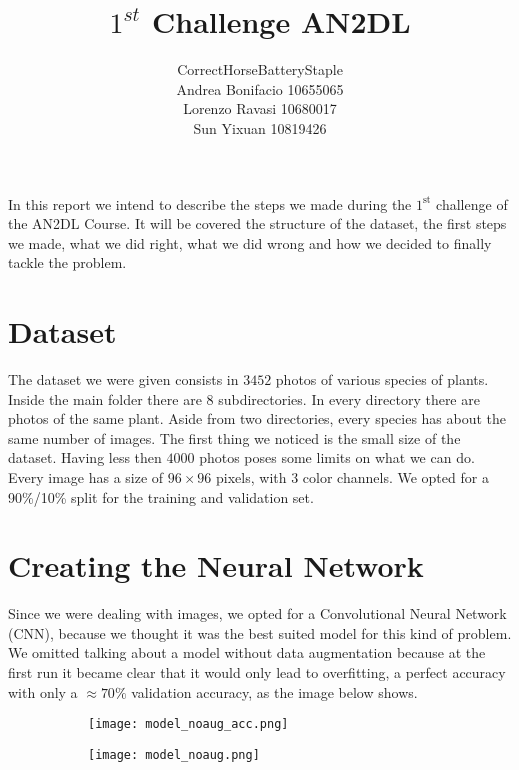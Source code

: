 \documentclass[a4paper,11pt]{article}
\numberwithin{equation}{section}
\begin{document}
\title{\vspace{-3cm}\(1^{st}\) Challenge AN2DL}
\author{CorrectHorseBatteryStaple \\
Andrea Bonifacio 10655065 \\
Lorenzo Ravasi 10680017 \\
Sun Yixuan 10819426}
\date{}
\maketitle
In this report we intend to describe the steps we made during the \(1^{\text{st}}\) challenge of the AN2DL Course. It will be covered the structure of the dataset, the first steps we made, what we did right, what we did wrong and how we decided to finally tackle the problem.
\section*{Dataset}
The dataset we were given consists in \(3452\) photos of various species of plants. Inside the main folder there are \(8\) subdirectories. In every directory there are photos of the same plant. Aside from two directories, every species has about the same number of images. The first thing we noticed is the small size of the dataset. Having less then \(4000\) photos poses some limits on what we can do. Every image has a size of \(96 \times 96\) pixels, with \(3\) color channels. We opted for a 90\%/10\% split for the training and validation set.
\section*{Creating the Neural Network}
Since we were dealing with images, we opted for a Convolutional Neural Network (CNN), because we thought it was the best suited model for this kind of problem. We omitted talking about a model without data augmentation because at the first run it became clear that it would only lead to overfitting, a perfect accuracy with only a \(\approx 70\%\) validation accuracy, as the image below shows. 
\begin{figure}[h]
      \begin{subfigure}{0.5\textwidth}

      \texttt{[image: model\_noaug\_acc.png]}  
      \end{subfigure}
      \begin{subfigure}{0.4\textwidth}
            \texttt{[image: model\_noaug.png]}
      \end{subfigure}
\end{figure}
\end{document}
